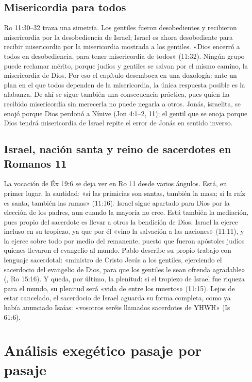 \subsection{Misericordia para todos}
Ro 11:30--32 traza una simetría. Los gentiles fueron desobedientes y recibieron misericordia por la desobediencia de Israel; Israel es ahora desobediente para recibir misericordia por la misericordia mostrada a los gentiles. «Dios encerró a todos en desobediencia, para tener misericordia de todos» (11:32). Ningún grupo puede reclamar mérito, porque judíos y gentiles se salvan por el mismo camino, la misericordia de Dios. Por eso el capítulo desemboca en una doxología: ante un plan en el que todos dependen de la misericordia, la única respuesta posible es la alabanza. De ahí se sigue también una consecuencia práctica, pues quien ha recibido misericordia sin merecerla no puede negarla a otros. Jonás, israelita, se enojó porque Dios perdonó a Nínive (Jon 4:1--2, 11); el gentil que se enoja porque Dios tendrá misericordia de Israel repite el error de Jonás en sentido inverso.

\subsection{Israel, nación santa y reino de sacerdotes en Romanos 11}
La vocación de Éx 19:6 se deja ver en Ro 11 desde varios ángulos. Está, en primer lugar, la santidad: «si las primicias son santas, también la masa; si la raíz es santa, también las ramas» (11:16). Israel sigue apartado para Dios por la elección de los padres, aun cuando la mayoría no cree. Está también la mediación, pues propio del sacerdote es llevar a otros la bendición de Dios. Israel la ejerce incluso en su tropiezo, ya que por él «vino la salvación a las naciones» (11:11), y la ejerce sobre todo por medio del remanente, puesto que fueron apóstoles judíos quienes llevaron el evangelio al mundo. Pablo describe su propio trabajo con lenguaje sacerdotal: «ministro de Cristo Jesús a los gentiles, ejerciendo el sacerdocio del evangelio de Dios, para que los gentiles le sean ofrenda agradable» (, Ro 15:16). Y queda, por último, la plenitud: si el tropiezo de Israel fue riqueza para el mundo, su plenitud será «vida de entre los muertos» (11:15). Lejos de estar cancelado, el sacerdocio de Israel aguarda su forma completa, como ya había anunciado Isaías: «vosotros seréis llamados sacerdotes de YHWH» (Is 61:6).

\section{Análisis exegético pasaje por pasaje}\label{sec:exegesis}

